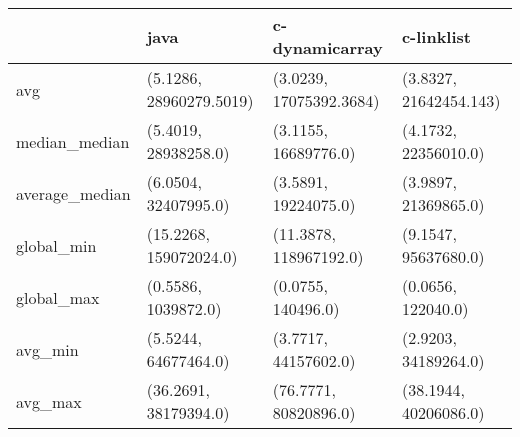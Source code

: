 \begin{tabular}{llll}
\toprule
{} &                     java &           c-dynamicarray &              c-linklist \\
\midrule
avg            &  (5.1286, 28960279.5019) &  (3.0239, 17075392.3684) &  (3.8327, 21642454.143) \\
median\_median  &     (5.4019, 28938258.0) &     (3.1155, 16689776.0) &    (4.1732, 22356010.0) \\
average\_median &     (6.0504, 32407995.0) &     (3.5891, 19224075.0) &    (3.9897, 21369865.0) \\
global\_min     &   (15.2268, 159072024.0) &   (11.3878, 118967192.0) &    (9.1547, 95637680.0) \\
global\_max     &      (0.5586, 1039872.0) &       (0.0755, 140496.0) &      (0.0656, 122040.0) \\
avg\_min        &     (5.5244, 64677464.0) &     (3.7717, 44157602.0) &    (2.9203, 34189264.0) \\
avg\_max        &    (36.2691, 38179394.0) &    (76.7771, 80820896.0) &   (38.1944, 40206086.0) \\
\bottomrule
\end{tabular}
